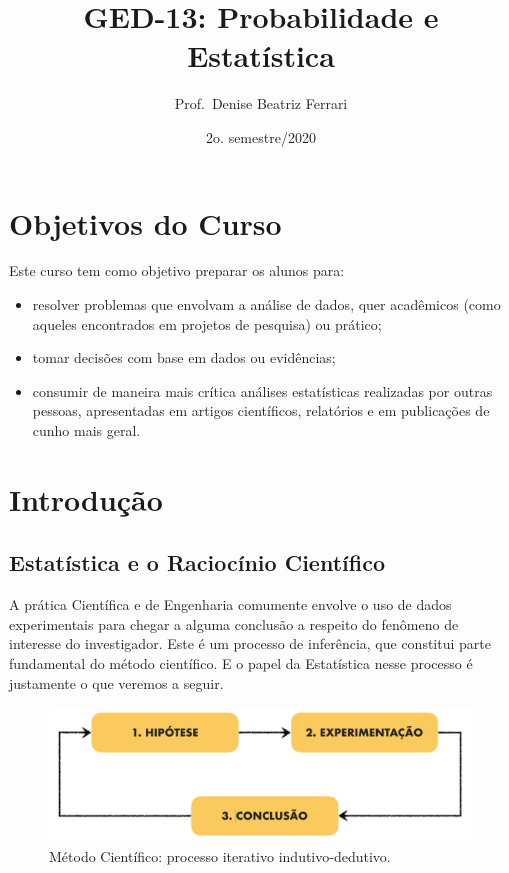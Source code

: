 \documentclass[
]{book}
\title{GED-13: Probabilidade e Estatística}
\author{Prof.~Denise Beatriz Ferrari}
\date{2o. semestre/2020}
\theoremstyle{definition}
\theoremstyle{definition}
\theoremstyle{definition}
\theoremstyle{remark}
\begin{document}
\maketitle

{
\setcounter{tocdepth}{1}
\tableofcontents
}
\hypertarget{objetivos-do-curso}{%
\chapter*{Objetivos do Curso}\label{objetivos-do-curso}}

Este curso tem como objetivo preparar os alunos para:

\begin{itemize}
\item
  resolver problemas que envolvam a análise de dados, quer acadêmicos (como aqueles encontrados em projetos de pesquisa) ou prático;
\item
  tomar decisões com base em dados ou evidências;
\item
  consumir de maneira mais crítica análises estatísticas realizadas por outras pessoas, apresentadas em artigos científicos, relatórios e em publicações de cunho mais geral.
\end{itemize}

\hypertarget{introduuxe7uxe3o}{%
\chapter{Introdução}\label{introduuxe7uxe3o}}

\hypertarget{estatuxedstica-e-o-raciocuxednio-cientuxedfico}{%
\section{Estatística e o Raciocínio Científico}\label{estatuxedstica-e-o-raciocuxednio-cientuxedfico}}

A prática Científica e de Engenharia comumente envolve o uso de dados experimentais para chegar a alguma conclusão a respeito do fenômeno de interesse do investigador. Este é um processo de inferência, que constitui parte fundamental do método científico. E o papel da Estatística nesse processo é justamente o que veremos a seguir.

\begin{figure}
\includegraphics[width=1\linewidth]{img/metodo-cientifico} \caption{Método Científico: processo iterativo indutivo-dedutivo.}\label{fig:ch1-metodo-cientifico}
\end{figure}
\end{document}
